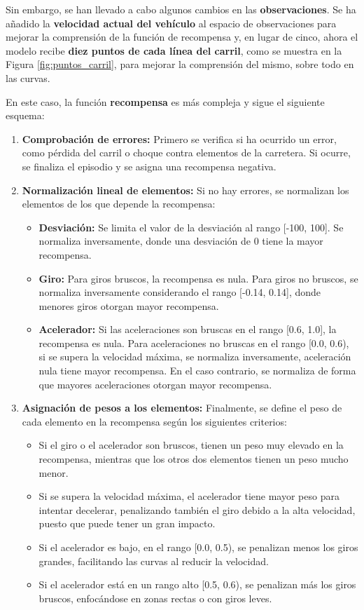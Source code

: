 Sin embargo, se han llevado a cabo algunos cambios en las \textbf{observaciones}. Se ha añadido la \textbf{velocidad actual del vehículo} al espacio de observaciones para mejorar la comprensión de la función de recompensa y, en lugar de cinco, ahora el modelo recibe \textbf{diez puntos de cada línea del carril}, como se muestra en la Figura \ref{fig:puntos_carril}, para mejorar la comprensión del mismo, sobre todo en las curvas.

En este caso, la función \textbf{recompensa} es más compleja y sigue el siguiente esquema:
\begin{enumerate}
    \item \textbf{Comprobación de errores:} Primero se verifica si ha ocurrido un error, como pérdida del carril o choque contra elementos de la carretera. Si ocurre, se finaliza el episodio y se asigna una recompensa negativa.

    \item \textbf{Normalización lineal de elementos:} Si no hay errores, se normalizan los elementos de los que depende la recompensa:
    \begin{itemize}
        \item \textbf{Desviación:} Se limita el valor de la desviación al rango [-100, 100]. Se normaliza inversamente, donde una desviación de 0 tiene la mayor recompensa.
        \item \textbf{Giro:} Para giros bruscos, la recompensa es nula. Para giros no bruscos, se normaliza inversamente considerando el rango [-0.14, 0.14], donde menores giros otorgan mayor recompensa.
        \item \textbf{Acelerador:} Si las aceleraciones son bruscas en el rango [0.6, 1.0], la recompensa es nula. Para aceleraciones no bruscas en el rango [0.0, 0.6), si se supera la velocidad máxima, se normaliza inversamente, aceleración nula tiene mayor recompensa. En el caso contrario, se normaliza de forma que mayores aceleraciones otorgan mayor recompensa.
    \end{itemize}

    \item \textbf{Asignación de pesos a los elementos:} Finalmente, se define el peso de cada elemento en la recompensa según los siguientes criterios:
    \begin{itemize}
        \item Si el giro o el acelerador son bruscos, tienen un peso muy elevado en la recompensa, mientras que los otros dos elementos tienen un peso mucho menor.
        \item Si se supera la velocidad máxima, el acelerador tiene mayor peso para intentar decelerar, penalizando también el giro debido a la alta velocidad, puesto que puede tener un gran impacto.
        \item Si el acelerador es bajo, en el rango [0.0, 0.5), se penalizan menos los giros grandes, facilitando las curvas al reducir la velocidad.
        \item Si el acelerador está en un rango alto [0.5, 0.6), se penalizan más los giros bruscos, enfocándose en zonas rectas o con giros leves.
    \end{itemize}
\end{enumerate}

